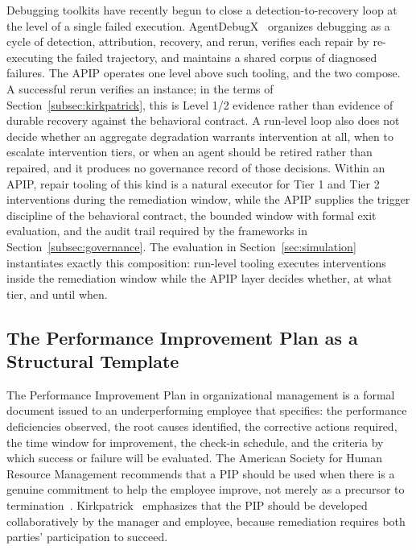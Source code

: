\documentclass[conference]{IEEEtran}
\begin{document}
Debugging toolkits have recently begun to close a detection-to-recovery loop at
the level of a single failed execution. AgentDebugX~\cite{zhu2026agentdebugx}
organizes debugging as a cycle of detection, attribution, recovery, and rerun,
verifies each repair by re-executing the failed trajectory, and maintains a
shared corpus of diagnosed failures. The APIP operates one level above such
tooling, and the two compose. A successful rerun verifies an instance; in the
terms of Section~\ref{subsec:kirkpatrick}, this is Level 1/2 evidence rather
than evidence of durable recovery against the behavioral contract. A run-level
loop also does not decide whether an aggregate degradation warrants intervention
at all, when to escalate intervention tiers, or when an agent should be retired
rather than repaired, and it produces no governance record of those decisions.
Within an APIP, repair tooling of this kind is a natural executor for Tier 1 and
Tier 2 interventions during the remediation window, while the APIP supplies the
trigger discipline of the behavioral contract, the bounded window with formal
exit evaluation, and the audit trail required by the frameworks in
Section~\ref{subsec:governance}. The evaluation in
Section~\ref{sec:simulation} instantiates exactly this composition: run-level
tooling executes interventions inside the remediation window while the APIP
layer decides whether, at what tier, and until when.

\subsection{The Performance Improvement Plan as a Structural Template}
\label{subsec:pip-template}

The Performance Improvement Plan in organizational management is a formal
document issued to an underperforming employee that specifies: the performance
deficiencies observed, the root causes identified, the corrective actions
required, the time window for improvement, the check-in schedule, and the
criteria by which success or failure will be evaluated. The American Society
for Human Resource Management recommends that a PIP should be used when there
is a genuine commitment to help the employee improve, not merely as a precursor
to termination~\cite{kirkpatrick2016four}.
Kirkpatrick~\cite{kirkpatrick1994evaluating,kirkpatrick2016four} emphasizes
that the PIP should be developed collaboratively by the manager and employee,
because remediation requires both parties' participation to succeed.
\end{document}
